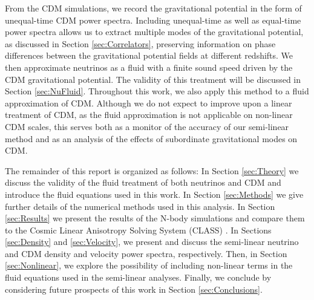 \documentclass[twocolumn,superscriptaddress,prd]{revtex4}
\begin{document}
From the CDM simulations, we record the gravitational
potential in the form of unequal-time CDM power
spectra. Including unequal-time as well as equal-time power spectra
allows us to extract multiple modes of the gravitational
potential, as discussed in Section \ref{sec:Correlators},
preserving information on phase differences between the gravitational potential
fields at different redshifts.  
We then approximate neutrinos as a fluid with a finite sound
speed driven by the CDM gravitational potential.  The
validity of this treatment will be discussed in Section
\ref{sec:NuFluid}.  Throughout this work, we also apply this 
method to a fluid approximation of CDM.  Although we do
not expect to improve upon a linear treatment of CDM, as the
fluid approximation is not applicable on non-linear CDM
scales, 
this serves both as a monitor
of the accuracy of our semi-linear method and as an analysis of the
effects of subordinate gravitational modes on CDM.

The remainder of this report is organized as follows:  In Section
\ref{sec:Theory} we discuss the validity of the fluid treatment
of both neutrinos and CDM and introduce the fluid equations
used in this work.  In Section \ref{sec:Methods} we give further
details of the numerical methods used in this analysis.  In Section
\ref{sec:Results} we present the results of the N-body
simulations and compare them to the Cosmic Linear Anisotropy
Solving System (CLASS) \citep{class11}.  In Sections
\ref{sec:Density} and \ref{sec:Velocity}, we
present
and discuss
 the semi-linear neutrino and CDM density
 and
velocity power spectra, respectively. 
Then, in Section \ref{sec:Nonlinear}, we explore the possibility of 
 including non-linear terms in the fluid equations used in the
 semi-linear analyses.
 Finally, we
conclude by considering future prospects of
this work in Section \ref{sec:Conclusions}.


\end{document}
